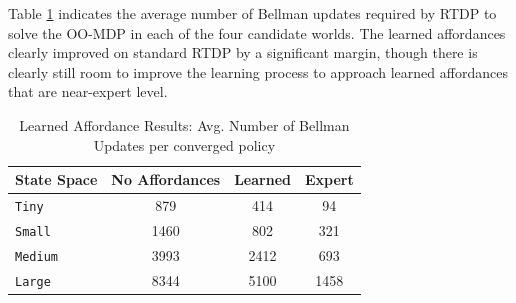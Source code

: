\documentclass[letterpaper]{article}
\begin{document}
\begin{table}
\centering

\caption{Expert Affordance Results: Avg. Number of Bellman Updates per converged policy}
\label{table:hard-results}
\end{table}

Table \ref{table:learned-results} indicates the average number of Bellman updates required by RTDP to solve the OO-MDP
in each of the four candidate worlds. The learned affordances clearly improved on standard RTDP by a significant margin, though
there is clearly still room to improve the learning process to approach learned affordances that are near-expert level.
\begin{table}
\centering
\begin{tabular}{ l || c c c }
  State Space & No Affordances & Learned & Expert  \\ \hline
  \texttt{Tiny}  		& 	879		&	414	&	 94	\\
  \texttt{Small}  	& 	1460		&	802	&	321  \\
  \texttt{Medium}  	& 	3993		&	2412	&	693  \\
  \texttt{Large}  	& 	8344		&	5100	&	1458
\end{tabular}
\caption{Learned Affordance Results: Avg. Number of Bellman Updates per converged policy}
\label{table:learned-results}
\end{table}
\end{document}
